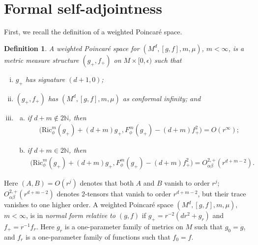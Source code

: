 \documentclass{amsart}
\newtheorem{definition}{Definition}[theorem]
\begin{document}
\section{Formal self-adjointness}
\label{sec:sa}
First, we recall the definition of a weighted Poincar\'e space. 
\begin{definition}
\label{poincare-definition}
A \emph{weighted Poincar\'e space} for $(M^d,[g,f],m,\mu)$, $m<\infty$, is a metric measure structure $(g_+,f_+)$ on $M\times [0,\epsilon)$ such that
\begin{enumerate}[(i)]
\item $g_+$ has signature $(d+1,0)$;
\item $(g_+,f_+)$ has $(M^d,[g,f],m,\mu)$ as conformal infinity; and

\item \begin{enumerate}[(a)]
\item if $d+m\notin 2\mathbb{N}$, then 
\begin{equation}
\begin{aligned}
\big(\text{Ric}_{\phi}^m(g_+)+(d+m)g_+,
F_\phi^m(g_+)
-(d+m)f_+^2\big)=O(r^\infty);\end{aligned} 
\end{equation}

\item if $d+m\in 2\mathbb{N}$, then 
\begin{equation}
\begin{aligned}
\big(\text{Ric}_{\phi}^m(g_+)+(d+m)g_+,
F_\phi^m(g_+)
-(d+m)f_+^2\big)=O^{2,+}_{\alpha\beta}(r^{d+m-2}).\end{aligned} 
\end{equation}
\end{enumerate}
\end{enumerate}
\end{definition}
{Here $(A,B)=O(r^j)$ denotes that both $A$ and $B$ vanish to order $r^j$; $O^{2,+}_{\alpha\beta}(r^{d+m-2})$ denotes $2$-tensors that vanish to order $r^{d+m-2}$, but their trace vanishes to one higher order.}
A weighted Poincar\'e space $(M^d,[g,f],m,\mu)$, $m<\infty$, is in \emph{normal form relative to $(g,f)$} if $g_+=r^{-2}(dr^2+g_r)$ and $f_+=r^{-1}f_r$. Here $g_r$ is a one-parameter family of metrics on $M$ such that $g_0=g$, and $f_r$ is a one-parameter family of functions such that $f_0=f$.
\end{document}

